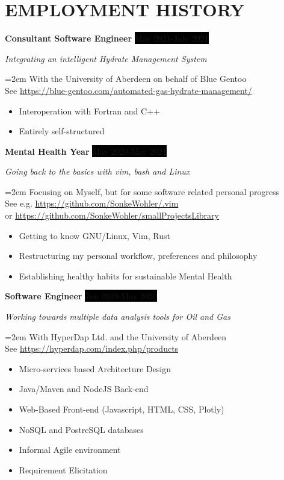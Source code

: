 \documentclass[paper=a4,fontsize=11pt]{scrartcl} %
\newcommand{\sepspace}{\vspace*{1em}}    %
\newcommand{\NewPart}[1]{\section*{\uppercase{{#1}}}}
\newcommand{\EducationEntry}[4]{
  \noindent \textbf{#1} \hfill      %
    \colorbox{Black}{%
      \parbox{6em}{%
      \hfill\color{White}#2}} \par  %
      \noindent \textit{#3} \par        %
      \noindent\hangindent=2em\hangafter=0 \small #4 %
    \normalsize \par}
\newcommand{\WorkEntry}[4]{          %
  \noindent \textbf{#1} \hfill      %
  \colorbox{Black}{\color{White}#2} \par  %
  \noindent \textit{#3} \par              %
  \noindent\hangindent=2em\hangafter=0 \small #4 %
  \normalsize \par}
\begin{document}

  \StylisedName
  \SameAddress

\sepspace

\NewPart{Employment History}{}

\WorkEntry{Consultant Software Engineer}{May 2021-July 2021}{Integrating an intelligent
Hydrate Management System}{With the University of Aberdeen on behalf of Blue
Gentoo \\
\hspace{5pt} \footnotesize See
\textcolor{headerColor}{\url{https://blue-gentoo.com/automated-gas-hydrate-management/}}
\vspace{5pt}
\begin{itemize}[noitemsep,topsep=0pt]
  \item Interoperation with Fortran and C++
  \item Entirely self-structured
\end{itemize}
}

\sepspace

\WorkEntry{Mental Health Year}{May 2020-May 2021}{Going back to the basics with
vim, bash and Linux}{Focusing on Myself, but for some software related personal progress   \\
\hspace{5pt} \footnotesize See e.g.
\textcolor{headerColor}{\url{https://github.com/SonkeWohler/.vim}}  \\
or 
\textcolor{headerColor}{\url{https://github.com/SonkeWohler/smallProjectsLibrary}}
\vspace{5pt}
\begin{itemize}[noitemsep,topsep=0pt]
  \item Getting to know GNU/Linux, Vim, Rust
  \item Restructuring my personal workflow, preferences and philosophy
  \item Establishing healthy habits for sustainable Mental Health
\end{itemize}
}

\sepspace

\WorkEntry{Software Engineer}{Jun 2019-May 2020}{Working towards multiple data
analysis tools for Oil and Gas}{With HyperDap Ltd. and the University of
Aberdeen \\
\hspace{5pt} \footnotesize See
\textcolor{headerColor}{\url{https://hyperdap.com/index.php/products}}
\vspace{5pt}
\begin{itemize}[noitemsep,topsep=0pt]
  \item Micro-services based Architecture Design
  \item Java/Maven and NodeJS Back-end
  \item Web-Based Front-end (Javascript, HTML, CSS, Plotly)
  \item NoSQL and PostreSQL databases
  \item Informal Agile environment
  \item Requirement Elicitation
\end{itemize}
}
\end{document}
